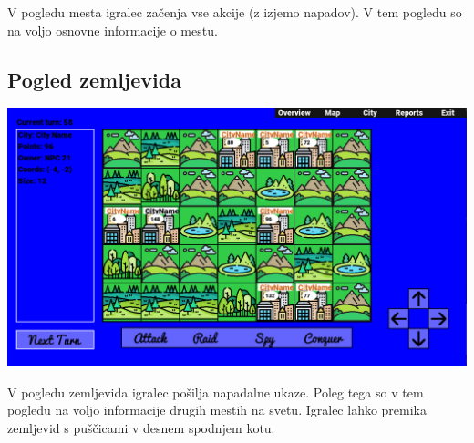 \documentclass[a4paper, 16pt]{article}
\begin{document}
V pogledu mesta igralec začenja vse akcije (z izjemo napadov). V tem pogledu so na voljo osnovne informacije o mestu.

\subsection{Pogled zemljevida}

\includegraphics[width=\textwidth]{3.png}

V pogledu zemljevida igralec pošilja napadalne ukaze. Poleg tega so v tem pogledu na voljo informacije drugih mestih na svetu. Igralec lahko premika zemljevid s puščicami v desnem spodnjem kotu.
\end{document}
